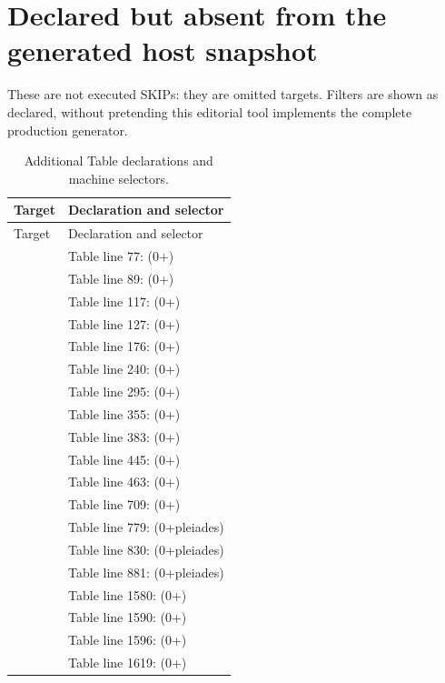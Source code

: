 \section{Declared but absent from the generated host snapshot}
These are not executed SKIPs: they are omitted targets. Filters are shown as declared, without pretending this editorial tool implements the complete production generator.
\begin{longtable}{L{0.48\textwidth}L{0.41\textwidth}}
\caption{Additional Table declarations and machine selectors.}\\
\toprule Target & Declaration and selector\\\midrule\endfirsthead
\toprule Target & Declaration and selector\\\midrule\endhead
{} & Table line 77: (0+)\\
 & Table line 89: (0+)\\
 & Table line 117: (0+)\\
 & Table line 127: (0+)\\
 & Table line 176: (0+)\\
 & Table line 240: (0+)\\
 & Table line 295: (0+)\\
 & Table line 355: (0+)\\
 & Table line 383: (0+)\\
 & Table line 445: (0+)\\
 & Table line 463: (0+)\\
 & Table line 709: (0+)\\
 & Table line 779: (0+pleiades)\\
 & Table line 830: (0+pleiades)\\
 & Table line 881: (0+pleiades)\\
 & Table line 1580: (0+)\\
 & Table line 1590: (0+)\\
 & Table line 1596: (0+)\\
 & Table line 1619: (0+)\\

\end{longtable}

